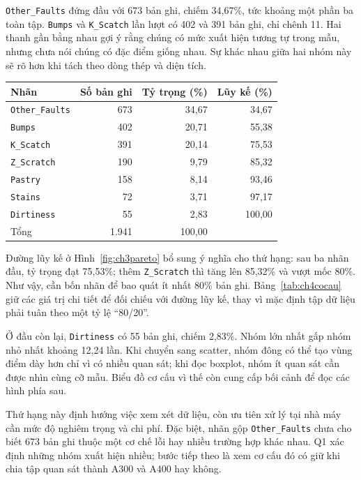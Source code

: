 \documentclass[12pt,a4paper,oneside]{report}
\newcommand{\maCot}[1]{{\urlstyle{tt}\def\UrlBreaks{\do\_\do\/\do\.}\def\UrlBigBreaks{}\nolinkurl{#1}}}
\begin{document}
\maCot{Other_Faults} đứng đầu với 673 bản ghi, chiếm 34,67\%, tức khoảng một phần ba toàn tập. \maCot{Bumps} và \maCot{K_Scatch} lần lượt có 402 và 391 bản ghi, chỉ chênh 11. Hai thanh gần bằng nhau gợi ý rằng chúng có mức xuất hiện tương tự trong mẫu, nhưng chưa nói chúng có đặc điểm giống nhau. Sự khác nhau giữa hai nhóm này sẽ rõ hơn khi tách theo dòng thép và diện tích.

\begin{center}\begin{minipage}{\linewidth}
\label{tab:ch4cocau}
\small{}
\begin{tabularx}{\linewidth}{@{}Y rrr@{}}
\toprule
Nhãn & Số bản ghi & Tỷ trọng (\%) & Lũy kế (\%) \\
\midrule
\maCot{Other_Faults} & 673 & 34,67 & 34,67 \\
\maCot{Bumps} & 402 & 20,71 & 55,38 \\
\maCot{K_Scatch} & 391 & 20,14 & 75,53 \\
\maCot{Z_Scratch} & 190 & 9,79 & 85,32 \\
\maCot{Pastry} & 158 & 8,14 & 93,46 \\
\maCot{Stains} & 72 & 3,71 & 97,17 \\
\maCot{Dirtiness} & 55 & 2,83 & 100,00 \\
\midrule
Tổng & 1.941 & 100,00 & \\
\bottomrule
\end{tabularx}
\end{minipage}\end{center}

Đường lũy kế ở Hình~\ref{fig:ch3pareto} bổ sung ý nghĩa cho thứ hạng: sau ba nhãn đầu, tỷ trọng đạt 75,53\%; thêm \maCot{Z_Scratch} thì tăng lên 85,32\% và vượt mốc 80\%. Như vậy, cần bốn nhãn để bao quát ít nhất 80\% bản ghi. Bảng~\ref{tab:ch4cocau} giữ các giá trị chi tiết để đối chiếu với đường lũy kế, thay vì mặc định tập dữ liệu phải tuân theo một tỷ lệ ``80/20''.

Ở đầu còn lại, \maCot{Dirtiness} có 55 bản ghi, chiếm 2,83\%. Nhóm lớn nhất gấp nhóm nhỏ nhất khoảng 12,24 lần. Khi chuyển sang scatter, nhóm đông có thể tạo vùng điểm dày hơn chỉ vì có nhiều quan sát; khi đọc boxplot, nhóm ít quan sát cần được nhìn cùng cỡ mẫu. Biểu đồ cơ cấu vì thế còn cung cấp bối cảnh để đọc các hình phía sau.

Thứ hạng này định hướng việc xem xét dữ liệu, còn ưu tiên xử lý tại nhà máy cần mức độ nghiêm trọng và chi phí. Đặc biệt, nhãn gộp \maCot{Other_Faults} chưa cho biết 673 bản ghi thuộc một cơ chế lỗi hay nhiều trường hợp khác nhau. Q1 xác định những nhóm xuất hiện nhiều; bước tiếp theo là xem cơ cấu đó có giữ khi chia tập quan sát thành A300 và A400 hay không.
\end{document}
